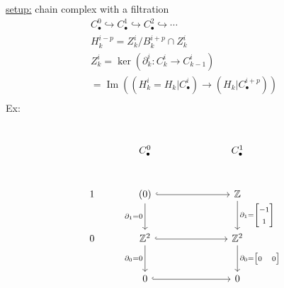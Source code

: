 \documentclass[11pt,a4paper]{report}
\DeclareMathOperator{\Ima}{Im}
\begin{document}
             \underline{setup:} chain complex with a filtration
              \begin{align*}
                C_\bullet^0 \hookrightarrow C_\bullet^1 \hookrightarrow C_\bullet^2 \hookrightarrow \cdots\\
                H_k^{i-p} = Z_k^i / B_k^{i+p} \cap Z_k^i\\
                Z_k^i = \ker (\partial_k^i : C_k^i \rightarrow C_{k-1}^i)\\
                =\Ima ((H_k^i = H_k | C_\bullet^i) \rightarrow (H_k | C_\bullet^{i+p}))\\
              \end{align*}
              Ex:\\
              \begin{center}
              \end{center}
              \begin{align*}
                \\
                \begin{tikzcd}[ampersand replacement=\&, sep=large]
                  \& C_\bullet^0 \&\& C_\bullet^1 \\
                  1 \& (0) \arrow[hookrightarrow]{rr} \arrow[d,swap,"\partial_1=0"]          \&\& \mathbb{Z} \arrow[d,"\partial_1={\begin{bmatrix}-1\\1\end{bmatrix}}"]\\
                  0 \& \mathbb{Z}^2 \arrow[hookrightarrow]{rr} \arrow[d,swap,"\partial_0=0"] \&\& \mathbb{Z}^2 \arrow[d,"\partial_0={\begin{bmatrix}0&0\end{bmatrix}}"]\\
                  \& 0 \arrow[hookrightarrow]{rr}              \&\& 0\\
                \end{tikzcd}
              \end{align*}
\end{document}
